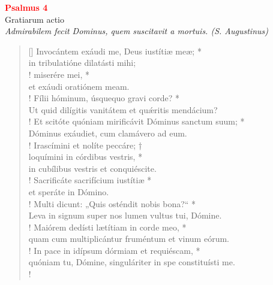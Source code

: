


\def\greinitialformat#1{%
{\fontsize{39}{39}\selectfont #1}%
}




\begin{center}
 \textcolor{red}{\large \bf Psalmus 4}\\
Gratiarum actio\\
\textit{\small Admirabilem fecit Dominus, quem suscitavit a mortuis. (S. Augustinus)}
\end{center}
\begin{verse}[\versewidth]
Invocántem exáudi me, Deus iustítiæ meæ; *\\
in tribulatióne dilatásti mihi;\\!
\vin miserére mei, *\\
\vin et exáudi oratiónem meam.\\!
Fílii hóminum, úsquequo gravi corde? *\\
Ut quid dilígitis vanitátem et qu\'{æ}ritis mendácium?\\!
\vin Et scitóte quóniam \verselinebreak mirificávit Dóminus sanctum suum; *\\
\vin Dóminus exáudiet, cum clamávero ad eum.\\!
Irascímini et nolíte peccáre; †\\
loquímini in córdibus vestris, *\\
in cubílibus vestris et conquiéscite.\\!
\vin Sacrificáte sacrifícium iustítiæ *\\
\vin et speráte in Dómino.\\!
Multi dicunt: „Quis osténdit nobis bona?“ *\\
Leva in signum super nos lumen vultus tui, Dómine.\\!
\vin Maiórem dedísti lætítiam in corde meo, *\\
\vin quam cum multiplicántur	fruméntum et vinum eórum.\\!
In pace in idípsum dórmiam et requiéscam, *\\
quóniam tu, Dómine, singuláriter in spe constituísti me.\\!
\end{verse}
\vspace{1cm}


